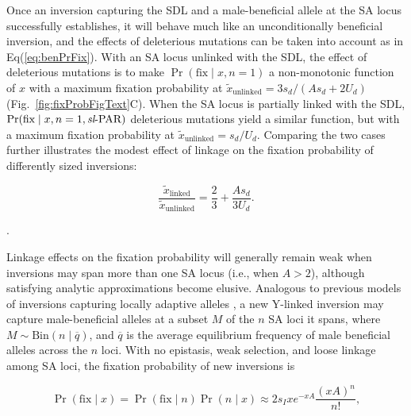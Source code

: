\documentclass{article}
\begin{document}
Once an inversion capturing the SDL and a male-beneficial allele at the SA locus successfully establishes, it will behave much like an unconditionally beneficial inversion, and the effects of deleterious mutations can be taken into account as in Eq(\ref{eq:benPrFix}). With an SA locus unlinked with the SDL, the effect of deleterious mutations is to make $\Pr(\text{fix} \mid x,n=1)$ a non-monotonic function of $x$ with a maximum fixation probability at $\tilde{x}_{\text{unlinked}} = 3 s_d/(A s_d + 2 U_d)$ (Fig.~\ref{fig:fixProbFigText}C). When the SA locus is partially linked with the SDL, $\Pr(\text{fix} \mid x,n=1,\text{{\itshape sl}-PAR})$ deleterious mutations yield a similar function, but with a maximum fixation probability at $\tilde{x}_{\text{unlinked}} = s_d/U_d$. Comparing the two cases further illustrates the modest effect of linkage on the fixation probability of differently sized inversions:

\begin{equation}\label{maxPrFix-wDel-SA}
	\frac{\tilde{x}_{\text{linked}}}{\tilde{x}_{\text{unlinked}}} = \frac{2}{3} + \frac{A s_d}{3 U_d}.
\end{equation}

.

Linkage effects on the fixation probability will generally remain weak when inversions may span more than one SA locus (i.e., when $A > 2$), although satisfying analytic approximations become elusive. Analogous to previous models of inversions capturing locally adaptive alleles \citep{KirkpatrickBarton2003, Connallon2018}, a new Y-linked inversion may capture male-beneficial alleles at a subset $M$ of the $n$ SA loci it spans, where $M \sim \text{Bin}(n \mid \overline{q})$, and $\overline{q}$ is the average equilibrium frequency of male beneficial alleles across the $n$ loci. With no epistasis, weak selection, and loose linkage among SA loci, the fixation probability of new inversions is

\begin{equation}\label{eq:SApFixMultiLoc}
	\Pr(\text{fix} \mid x) = \Pr(\text{fix} \mid n) \Pr(n \mid x) \approx 2 s_I x e^{-xA} \frac{(xA)^n}{n!},
\end{equation}
\end{document}
